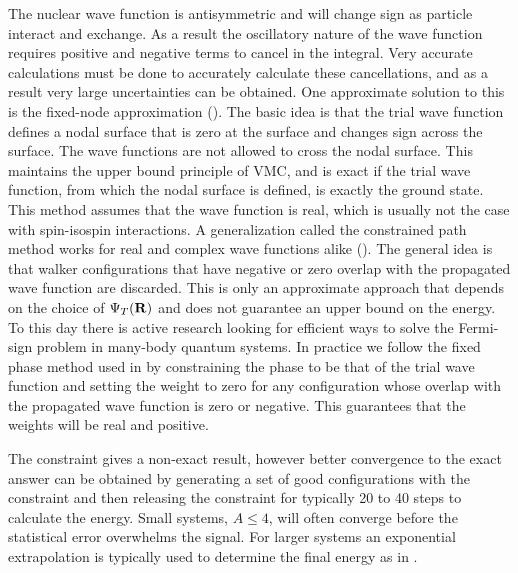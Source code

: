 The nuclear wave function is antisymmetric and will change sign as particle interact and exchange. As a result the oscillatory nature of the wave function requires positive and negative terms to cancel in the integral. Very accurate calculations must be done to accurately calculate these cancellations, and as a result very large uncertainties can be obtained. One approximate solution to this is the fixed-node approximation (\cite{moskowitz1982}). The basic idea is that the trial wave function defines a nodal surface that is zero at the surface and changes sign across the surface. The wave functions are not allowed to cross the nodal surface. This maintains the upper bound principle of VMC, and is exact if the trial wave function, from which the nodal surface is defined, is exactly the ground state. This method assumes that the wave function is real, which is usually not the case with spin-isospin interactions. A generalization called the constrained path method works for real and complex wave functions alike (\cite{wiringa2000}). The general idea is that walker configurations that have negative or zero overlap with the propagated wave function are discarded. This is only an approximate approach that depends on the choice of $\Psi_T(\mathbf{R})$ and does not guarantee an upper bound on the energy. To this day there is active research looking for efficient ways to solve the Fermi-sign problem in many-body quantum systems. In practice we follow the fixed phase method used in \cite{zhang2003} by constraining the phase to be that of the trial wave function and setting the weight to zero for any configuration whose overlap with the propagated wave function is zero or negative. This guarantees that the weights will be real and positive.

The constraint gives a non-exact result, however better convergence to the exact answer can be obtained by generating a set of good configurations with the constraint and then releasing the constraint for typically 20 to 40 steps to calculate the energy. Small systems, $A\le4$, will often converge before the statistical error overwhelms the signal. For larger systems an exponential extrapolation is typically used to determine the final energy as in \cite{pudliner1997}.

